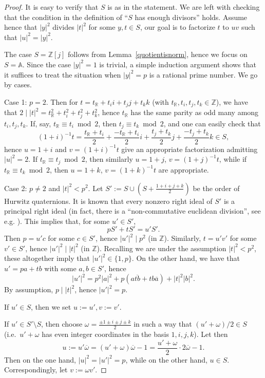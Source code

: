 \documentclass[11pt]{amsart}
\newcommand{\ZZ}{\mathbb{Z}}
\newcommand{\RR}{\mathbb{R}}
\theoremstyle{definition}
\theoremstyle{remark}
\begin{document}
\begin{proof}
It is easy to verify that $S$ is as in the statement. We are left with checking that the condition in the definition of ``$S$ has enough divisors'' holds. Assume hence that $|y|^2$ 
divides $|t|^2$ for some $y,t\in S$, our goal is to factorize $t$ to $uv$ such that $|u|^2=|y|^2$.

The case $S=\ZZ[j]$ follows from Lemma~\ref{quotientisnorm}, hence we focus on $S=\mathbb{A}$. Since the case $|y|^2=1$ is trivial, a simple induction argument shows that it suffices to treat the situation when $|y|^2=p$ is a rational prime number. We go by cases.

Case 1: $p=2$. Then for $t=t_{\RR}+t_i i+t_j j+ t_k k$ (with $t_{\RR},t_i,t_j,t_k\in\ZZ$), we have that $2\mid |t|^2=t_{\RR}^2+t_i^2+t_j^2+t_k^2$, hence $t_{\RR}$ has the same parity as odd many among $t_i,t_j,t_k$. If, say, $t_{\RR}\equiv t_i\bmod 2$, then $t_j\equiv t_k \bmod 2$, and one can easily check that
\[(1+i)^{-1}t=\frac{t_{\RR}+t_i}{2}+\frac{-t_{\RR}+t_i}{2}i+\frac{t_j+t_k}{2}j+\frac{-t_j+t_k}{2}k\in S,\]
hence $u=1+i$ and $v=(1+i)^{-1}t$ give an appropriate factorization admitting $|u|^2=2$. If $t_{\RR}\equiv t_j \bmod 2$, then similarly $u=1+j$, $v=(1+j)^{-1}t$, while if $t_{\RR}\equiv t_k \bmod 2$, then $u=1+k$, $v=(1+k)^{-1}t$ are appropriate.

Case 2: $p\neq 2$ and $|t|^2<p^2$. Let $S':=S\cup(S+\frac{1+i+j+k}{2})$ be the order of Hurwitz quaternions. It is known that every nonzero right ideal of $S'$ is a principal right ideal (in fact, there is a ``non-commutative euclidean division'', see e.g. \cite[Section~5.1]{ConwaySmith}). This implies that, for some $u'\in S'$,
\[
pS'+tS'=u'S'.
\]
Then $p=u'c$ for some $c\in S'$, hence $|u'|^2\mid p^2$ (in $\ZZ$). Similarly, $t=u'v'$ for some $v'\in S'$, hence $|u'|^2\mid |t|^2$ (in $\ZZ$). Recalling we are under the assumption $|t|^2<p^2$, these altogether imply that $|u'|^2\in\{1,p\}$. On the other hand, we have that
$u'=pa+tb$ with some $a,b\in S'$, hence
\[
|u'|^2=p^2|a|^2+p(a\overline{tb}+tb\overline{a})+|t|^2|b|^2.
\]
By assumption, $p\mid |t|^2$, hence $|u'|^2=p$.

If $u'\in S$, then we set $u:=u',v:=v'$.

If $u'\in S'\setminus S$, then choose $\omega=\frac{\pm 1 \pm i \pm j \pm k}{2}$ in such a way that $(u'+\omega)/2\in S$ (i.e.~$u'+\omega$ has even integer coordinates in the basis $1,i,j,k$). Let then
\[
u:=u'\overline{\omega}=(u'+\omega)\overline{\omega}-1=\frac{u'+\omega}{2}\cdot 2\overline{\omega}-1.
\]
Then on the one hand, $|u|^2=|u'|^2=p$, while on the other hand, $u\in S$. Correspondingly, let $v:=\omega v'$.


\end{proof}
\end{document}

